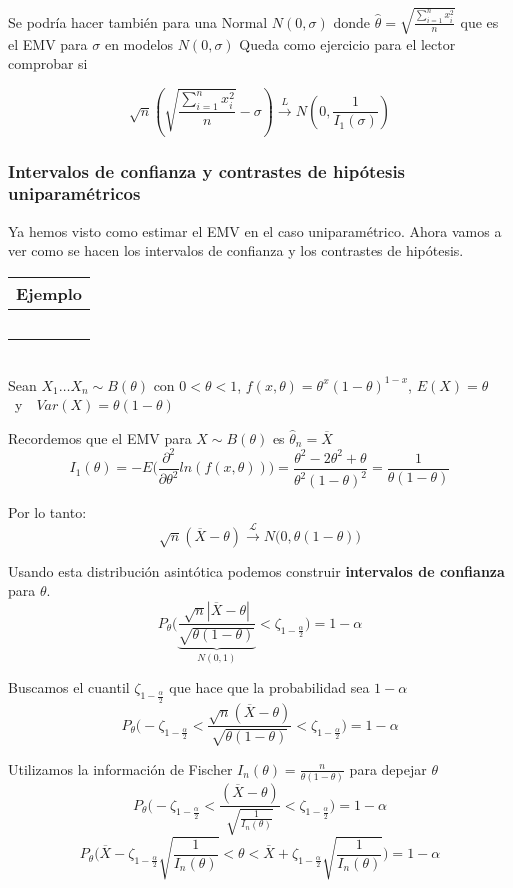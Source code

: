 Se podría hacer también para una Normal $N(0,\sigma)$ donde $\hat{\theta}=\sqrt{\frac{\sum_{i=1}^{n}x^2_i}{n}}$ que es el EMV para $\sigma$ en modelos $N(0,\sigma)$
Queda como ejercicio para el lector comprobar si

\[
    \sqrt{n}\left(\sqrt{\frac{\sum_{i=1}^{n}x^2_i}{n}}-\sigma\right)\overset{L}{\to}N\left(0,\frac{1}{I_1(\sigma)}\right)
\]
\newpage
\subsubsection{Intervalos de confianza y contrastes de hipótesis uniparamétricos}

Ya hemos visto como estimar el EMV en el caso uniparamétrico. Ahora vamos a ver como se hacen los intervalos de confianza y los contrastes de hipótesis.

\hspace{-1cm}\noindent\begin{tabular}{r}
    \textbf{Ejemplo}  \\ \hline \ \\
\end{tabular}\\
Sean $X_1\dots X_n\sim B(\theta)$ con $0<\theta < 1$, $f(x,\theta)=\theta^x(1-\theta)^{1-x}$, $E(X)=\theta$\ y\ \ $Var(X)=\theta(1-\theta)$

Recordemos que el EMV para $X\sim B(\theta)$ es $\hat\theta_n=\overline{X}$
$$I_1(\theta)=-E\Big(\frac{\partial^2}{\partial\theta^2}ln(f(x,\theta))\Big)=\frac{\theta^2-2\theta^2+\theta}{\theta^2(1-\theta)^2}=\frac{1}{\theta(1-\theta)}$$

Por lo tanto: 
$$\sqrt{n}(\overline{X}-\theta)\overset{\mathcal{L}}{\longrightarrow}N\big(0,\theta(1-\theta)\big)$$

Usando esta distribución asintótica podemos construir \textbf{intervalos de confianza} para $\theta$.
$$P_\theta\Bigg(\underbrace{\frac{\sqrt{n}|\overline{X}-\theta|}{\sqrt{\theta(1-\theta)}}}_{N(0,1)}<\zeta_{1-\frac{\alpha}{2}}\Bigg)=1-\alpha$$

Buscamos el cuantil $\zeta_{1-\frac{\alpha}{2}}$ que hace que la probabilidad sea $1-\alpha$
$$P_\theta\Bigg(-\zeta_{1-\frac{\alpha}{2}}<\frac{\sqrt{n}(\overline{X}-\theta)}{\sqrt{\theta(1-\theta)}}<\zeta_{1-\frac{\alpha}{2}}\Bigg)=1-\alpha$$

Utilizamos la información de Fischer $I_n(\theta)=\frac{n}{\theta(1-\theta)}$ para depejar $\theta$
$$P_\theta\Bigg(-\zeta_{1-\frac{\alpha}{2}}<\frac{(\overline{X}-\theta)}{\sqrt{\frac{1}{I_n(\theta)}}}<\zeta_{1-\frac{\alpha}{2}}\Bigg)=1-\alpha$$
$$P_\theta\Bigg(\overline{X}-\zeta_{1-\frac{\alpha}{2}}\sqrt{\frac{1}{I_n(\theta)}}<\theta<\overline{X}+\zeta_{1-\frac{\alpha}{2}}\sqrt{\frac{1}{I_n(\theta)}}\Bigg)=1-\alpha$$

